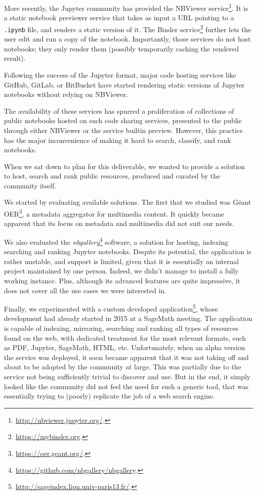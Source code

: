 More recently, the Jupyter community has provided the NBViewer
service\footnote{\url{http://nbviewer.jupyter.org/}.}. It is a static
notebook previewer service that takes as input a URL pointing to a
\texttt{.ipynb} file, and renders a static version of it. The Binder
service\footnote{\url{https://mybinder.org}.} further lets the user edit
and run a copy of the notebook. Importantly, those services do not host
notebooks; they only render them (possibly temporarily caching the
rendered result).

Following the success of the Jupyter format, major code hosting services
like GitHub, GitLab, or BitBucket have started rendering static versions
of Jupyter notebooks without relying on NBViewer.

The availability of these services has spurred a proliferation of
collections of public notebooks hosted on such code sharing services,
presented to the public through either NBViewer or the service builtin
preview. However, this practice has the major inconvenience of making it
hard to search, classify, and rank notebooks.

When we sat down to plan for this deliverable, we wanted to provide a
solution to host, search and rank public resources, produced and curated
by the community itself.

We started by evaluating available solutions. The first that we studied
was Géant OER\footnote{\url{https://oer.geant.org/}.}, a metadata
aggregator for multimedia content. It quickly became apparent that its
focus on metadata and multimedia did not suit our needs.

We also evaluated the \emph{nbgallery}\footnote{\url{https://github.com/nbgallery/nbgallery}.}
software, a solution for hosting, indexing searching and ranking Jupyter
notebooks. Despite its potential, the application is rather unstable,
and support is limited, given that it is essentially an internal project
maintained by one person. Indeed, we didn't manage to install a fully
working instance. Plus, although its advanced features are quite
impressive, it does not cover all the use cases we were interested in.

Finally, we experimented with a custom developed application\footnote{\url{http://sageindex.lipn.univ-paris13.fr/}.},
whose development had already started in 2015 at a SageMath meeting. The
application is capable of indexing, mirroring, searching and ranking all
types of resources found on the web, with dedicated treatment for the
most relevant formats, such as PDF, Jupyter, SageMath, HTML, etc.
Unfortunately, when an alpha version the service was deployed, it soon
became apparent that it was not taking off and about to be adopted by
the community at large. This was partially due to the service not being
sufficiently trivial to discover and use. But in the end, it simply
looked like the community did not feel the need for such a generic tool,
that was essentially trying to (poorly) replicate the job of a web
search engine.

